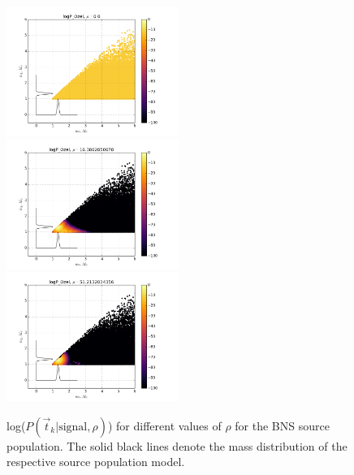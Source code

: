 \documentclass[twocolumn,showpacs,unsortedaddress,superscriptaddress,showkeys,nofootinbib,preprintnumbers,letterpaper]{revtex4-1}
\begin{document}
\begin{figure}
\includegraphics[width=0.5\textwidth]{logP_Ozelrho0_0.png}
\includegraphics[width=0.5\textwidth]{logP_Ozelrho16_3802850078.png}
\includegraphics[width=0.5\textwidth]{logP_Ozelrho51_2132034356.png}
\caption{log($P(\vec{t}_k|\text{signal},\rho)$) for different values of $\rho$ for the BNS source population. The solid black lines denote the mass distribution of the respective source population model.}
\label{fig:P_tkj_BNS}
\end{figure}
\end{document}
